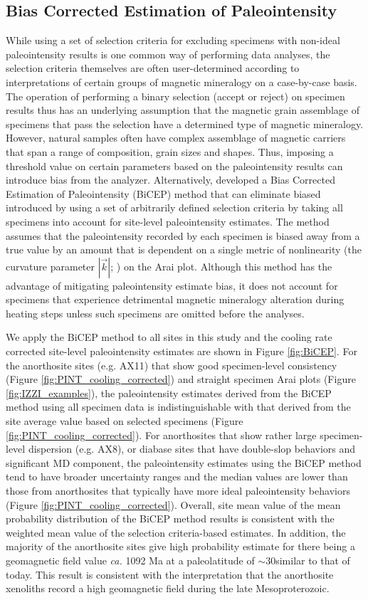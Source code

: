 \documentclass[draft]{agujournal2019}
\begin{document}
\subsection*{Bias Corrected Estimation of Paleointensity}
While using a set of selection criteria for excluding specimens with non-ideal paleointensity results is one common way of performing data analyses, the selection criteria themselves are often user-determined according to interpretations of certain groups of magnetic mineralogy on a case-by-case basis. The operation of performing a binary selection (accept or reject) on specimen results thus has an underlying assumption that the magnetic grain assemblage of specimens that pass the selection have a determined type of magnetic mineralogy. However, natural samples often have complex assemblage of magnetic carriers that span a range of composition, grain sizes and shapes. Thus, imposing a threshold value on certain parameters based on the paleointensity results can introduce bias from the analyzer. Alternatively,  developed a Bias Corrected Estimation of Paleointensity (BiCEP) method that can eliminate biased introduced by using a set of arbitrarily defined selection criteria by taking all specimens into account for site-level paleointensity estimates. The method assumes that the paleointensity recorded by each specimen is biased away from a true value by an amount that is dependent on a single metric of nonlinearity (the curvature parameter $|\vec{k}|$; ) on the Arai plot. Although this method has the advantage of mitigating paleointensity estimate bias, it does not account for specimens that experience detrimental magnetic mineralogy alteration during heating steps unless such specimens are omitted before the analyses. 

We apply the BiCEP method to all sites in this study and the cooling rate corrected site-level paleointensity estimates are shown in Figure \ref{fig:BiCEP}. For the anorthosite sites (e.g. AX11) that show good specimen-level consistency (Figure \ref{fig:PINT_cooling_corrected}) and straight specimen Arai plots (Figure \ref{fig:IZZI_examples}), the paleointensity estimates derived from the BiCEP method using all specimen data is indistinguishable with that derived from the site average value based on selected specimens (Figure \ref{fig:PINT_cooling_corrected}). For anorthosites that show rather large specimen-level dispersion (e.g. AX8), or diabase sites that have double-slop behaviors and significant MD component, the paleointensity estimates using the BiCEP method tend to have broader uncertainty ranges and the median values are lower than those from anorthosites that typically have more ideal paleointensity behaviors (Figure \ref{fig:PINT_cooling_corrected}). Overall, site mean value of the mean probability distribution of the BiCEP method results is consistent with the weighted mean value of the selection criteria-based estimates. In addition, the majority of the anorthosite sites give high probability estimate for there being a geomagnetic field value \textit{ca.} 1092 Ma at a paleolatitude of $\sim$30\textdegree similar to that of today. This result is consistent with the interpretation that the anorthosite xenoliths record a high geomagnetic field during the late Mesoproterozoic.
\end{document}
